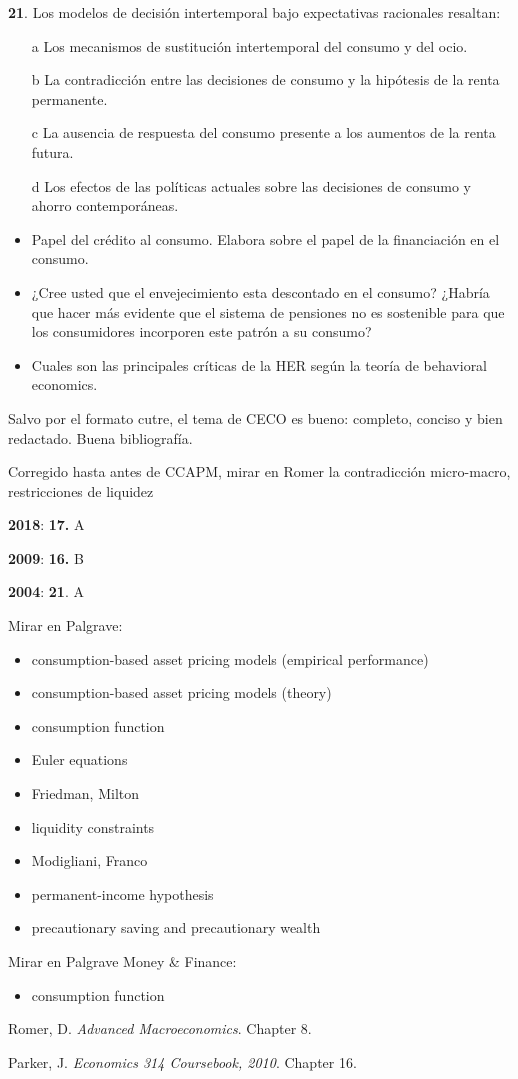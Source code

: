 \documentclass{nuevotema}
\begin{document}
\textbf{21}. Los modelos de decisión intertemporal bajo expectativas racionales resaltan:
\begin{enumerate}
	\item[a] Los mecanismos de sustitución intertemporal del consumo y del ocio.
	\item[b] La contradicción entre las decisiones de consumo y la hipótesis de la renta permanente.
	\item[c] La ausencia de respuesta del consumo presente a los aumentos de la renta futura.
	\item[d] Los efectos de las políticas actuales sobre las decisiones de consumo y ahorro contemporáneas.
\end{enumerate}

\begin{itemize}
    \item Papel del crédito al consumo. Elabora sobre el papel de la financiación en el consumo.
    \item ¿Cree usted que el envejecimiento esta descontado en el consumo? ¿Habría que hacer más evidente que el sistema de pensiones no es sostenible para que los consumidores incorporen este patrón a su consumo?
    \item Cuales son las principales críticas de la HER según la teoría de behavioral economics.
\end{itemize}

\notas

Salvo por el formato cutre, el tema de CECO es bueno: completo, conciso y bien redactado. Buena bibliografía.

Corregido hasta antes de CCAPM, mirar en Romer la contradicción micro-macro, restricciones de liquidez

\textbf{2018}: \textbf{17.} A

\textbf{2009}: \textbf{16.} B

\textbf{2004}: \textbf{21}. A

\bibliografia

Mirar en Palgrave:
\begin{itemize}

    \item consumption-based asset pricing models (empirical performance)
    \item consumption-based asset pricing models (theory)
	\item consumption function
    \item Euler equations
    \item Friedman, Milton
    \item liquidity constraints
    \item Modigliani, Franco
    \item permanent-income hypothesis
    \item precautionary saving and precautionary wealth
\end{itemize}

Mirar en Palgrave Money \& Finance:
\begin{itemize}
	\item consumption function
\end{itemize}

Romer, D. \textit{Advanced Macroeconomics}. Chapter 8.

Parker, J. \textit{Economics 314 Coursebook, 2010}. Chapter 16.
\end{document}
